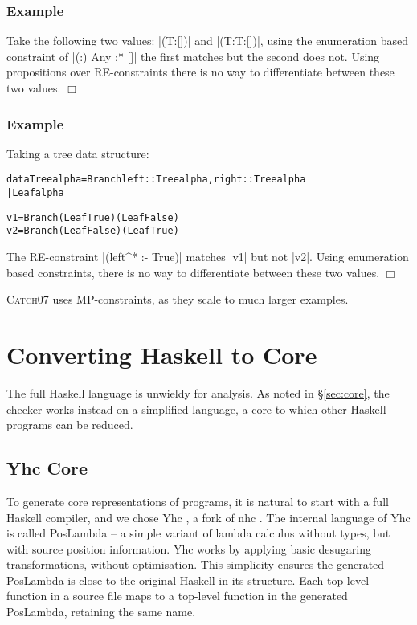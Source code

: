 \documentclass[preprint]{sigplanconf}
\newcommand{\catch}{\textsc{Catch}}
\newcounter{exmp}
\newcommand{\yesexample}{\subsubsection*{Example \arabic{exmp}}\addtocounter{exmp}{1}}
\newcommand{\noexample}{\hfill$\Box$}
\newenvironment{code}{\begin{alltt}\small}{\end{alltt}}
\newenvironment{example}{\yesexample}{\noexample}
\begin{document}
\begin{example}
Take the following two values: |(T:[])| and |(T:T:[])|, using the enumeration based constraint of |{(:) Any} :* {[]}| the first matches but the second does not. Using propositions over RE-constraints there is no way to differentiate between these two values.
\end{example}

\begin{example}
Taking a tree data structure:

\begin{code}
data Tree alpha  =  Branch {left :: Tree alpha, right :: Tree alpha}
                 |  Leaf alpha

v1 = Branch (Leaf True   ) (Leaf False  )
v2 = Branch (Leaf False  ) (Leaf True   )
\end{code}

The RE-constraint |(left^* :- True)| matches |v1| but not |v2|. Using enumeration based constraints, there is no way to differentiate between these two values.
\end{example}

\catch07 uses MP-constraints, as they scale to much larger examples.

\section{Converting Haskell to Core}
\label{sec:transform}

The full Haskell language is unwieldy for analysis. As noted in \S\ref{sec:core}, the checker works instead on a simplified language, a core to which other Haskell programs can be reduced.

\subsection{Yhc Core}

To generate core representations of programs, it is natural to start with a full Haskell compiler, and we chose Yhc \citep{Yhc}, a fork of nhc \citep{nhc}. The internal language of Yhc is called PosLambda -- a simple variant of lambda calculus without types, but with source position information. Yhc works by applying basic desugaring transformations, without optimisation. This simplicity ensures the generated PosLambda is close to the original Haskell in its structure. Each top-level function in a source file maps to a top-level function in the generated PosLambda, retaining the same name.
\end{document}
